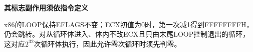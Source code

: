 {\color{ink}\bfseries 其标志副作用须依指令定义}\par\vspace{1bp}x86的LOOP保持EFLAGS不变；ECX初值为0时，第一次减1得到FFFFFFFFH，仍会跳转。对从循环体进入、体内不改ECX且只由末尾LOOP控制退出的循环，这对应\(2^{32}\)次循环体执行，因此允许零次循环时须先判零。
